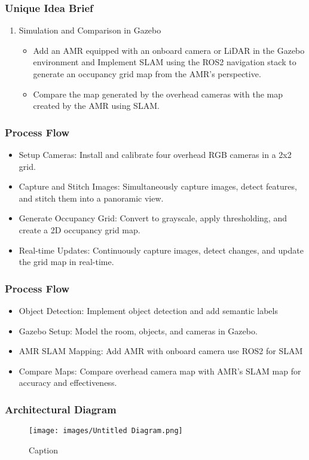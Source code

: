 \documentclass{beamer}
\begin{document}
\begin{frame}
  \frametitle{Unique Idea Brief}
  \begin{enumerate}
        \item Simulation and Comparison in Gazebo
    \begin{itemize}
    \item Add an AMR equipped with an onboard camera or LiDAR in the Gazebo environment and Implement SLAM using the ROS2 navigation stack to generate an occupancy grid map from the AMR's perspective.
    \item Compare the map generated by the overhead cameras with the map created by the AMR using SLAM.
  \end{itemize}
  \end{enumerate}
\end{frame}

\begin{frame}
  \frametitle{Process Flow}
    \begin{itemize}
      \item Setup Cameras: Install and calibrate four overhead RGB cameras in a 2x2 grid.
      \item Capture and Stitch Images: Simultaneously capture images, detect features, and stitch them into a panoramic view.
    \item Generate Occupancy Grid: Convert to grayscale, apply thresholding, and create a 2D occupancy grid map.
      \item Real-time Updates: Continuously capture images, detect changes, and update the grid map in real-time.
    \end{itemize}
\end{frame}

\begin{frame}
  \frametitle{Process Flow}
    \begin{itemize}
 \item Object Detection: Implement object detection and add semantic labels
    \item Gazebo Setup: Model the room, objects, and cameras in Gazebo.
      \item AMR SLAM Mapping: Add AMR with onboard camera use ROS2 for SLAM
      \item Compare Maps: Compare overhead camera map with AMR’s SLAM map for accuracy and effectiveness.
       \end{itemize}
\end{frame}
\begin{frame}

  \frametitle{Architectural Diagram }
  \begin{figure}
      \centering
      \texttt{[image: images/Untitled Diagram.png]}
      \caption{Caption}
      \label{fig:enter-label}
  \end{figure}
\end{frame}
\end{document}

